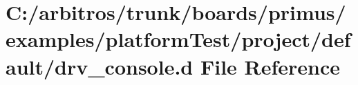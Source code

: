 \hypertarget{platform_test_2project_2default_2drv__console_8d}{\section{C\-:/arbitros/trunk/boards/primus/examples/platform\-Test/project/default/drv\-\_\-console.d File Reference}
\label{platform_test_2project_2default_2drv__console_8d}
}
